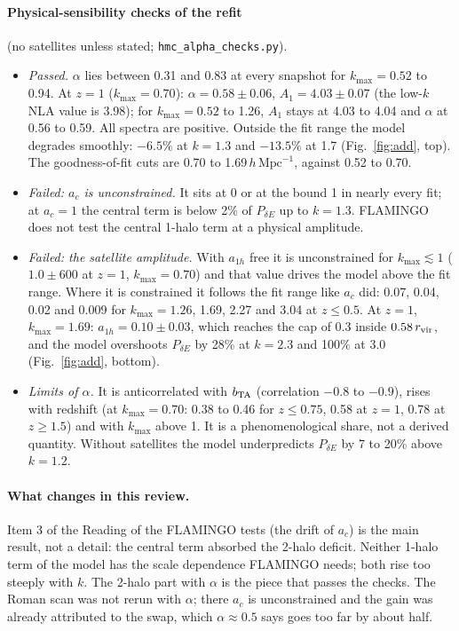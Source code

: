\documentclass[11pt]{article}
\newcommand{\hmpc}{\,h\,\mathrm{Mpc}^{-1}}
\newcommand{\kmax}{k_{\max}}
\newcommand{\bTA}{b_{\rm TA}}
\begin{document}
\paragraph{Physical-sensibility checks of the refit} (no satellites unless
stated; \texttt{hmc\_alpha\_checks.py}).
\begin{itemize}[itemsep=1pt]
\item \emph{Passed.} $\alpha$ lies between 0.31 and 0.83 at every snapshot for
  $\kmax = 0.52$ to 0.94. At $z = 1$ ($\kmax = 0.70$): $\alpha = 0.58 \pm 0.06$,
  $A_1 = 4.03 \pm 0.07$ (the low-$k$ NLA value is 3.98); for $\kmax = 0.52$ to
  1.26, $A_1$ stays at 4.03 to 4.04 and $\alpha$ at 0.56 to 0.59. All spectra
  are positive. Outside the fit range the model degrades smoothly: $-6.5\%$ at
  $k = 1.3$ and $-13.5\%$ at 1.7 (Fig.~\ref{fig:add}, top). The
  goodness-of-fit cuts are 0.70 to 1.69$\hmpc$, against 0.52 to 0.70.
\item \emph{Failed: $a_c$ is unconstrained.} It sits at 0 or at the bound 1 in
  nearly every fit; at $a_c = 1$ the central term is below 2\% of
  $P_{\delta E}$ up to $k = 1.3$. FLAMINGO does not test the central 1-halo
  term at a physical amplitude.
\item \emph{Failed: the satellite amplitude.} With $a_{1h}$ free it is
  unconstrained for $\kmax \lesssim 1$ ($1.0 \pm 600$ at $z = 1$,
  $\kmax = 0.70$) and that value drives the model above the fit range. Where
  it is constrained it follows the fit range like $a_c$ did: 0.07, 0.04, 0.02
  and 0.009 for $\kmax = 1.26$, 1.69, 2.27 and 3.04 at $z \le 0.5$. At $z = 1$,
  $\kmax = 1.69$: $a_{1h} = 0.10 \pm 0.03$, which reaches the cap of 0.3 inside
  $0.58\,r_{\rm vir}$, and the model overshoots $P_{\delta E}$ by 28\% at
  $k = 2.3$ and 100\% at 3.0 (Fig.~\ref{fig:add}, bottom).
\item \emph{Limits of $\alpha$.} It is anticorrelated with $\bTA$ (correlation
  $-0.8$ to $-0.9$), rises with redshift (at $\kmax = 0.70$: 0.38 to 0.46 for
  $z \le 0.75$, 0.58 at $z = 1$, 0.78 at $z \ge 1.5$) and with $\kmax$ above 1.
  It is a phenomenological share, not a derived quantity. Without satellites
  the model underpredicts $P_{\delta E}$ by 7 to 20\% above $k = 1.2$.
\end{itemize}

\paragraph{What changes in this review.} Item 3 of the Reading of the FLAMINGO
tests (the drift of $a_c$) is the main result, not a detail: the central term
absorbed the 2-halo deficit. Neither 1-halo term of the model has the scale
dependence FLAMINGO needs; both rise too steeply with $k$. The 2-halo part
with $\alpha$ is the piece that passes the checks. The Roman scan was not
rerun with $\alpha$; there $a_c$ is unconstrained and the gain was already
attributed to the swap, which $\alpha \approx 0.5$ says goes too far by about
half.
\end{document}
